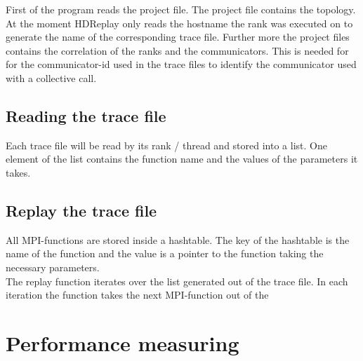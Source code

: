 \documentclass[10pt,a4paper]{scrartcl}
\begin{document}
\begin{small}
First of the program reads the project file. The project file contains the
topology. At the moment HDReplay only reads the hostname the rank was executed
on to generate the name of the corresponding trace file. Further more the
project files contains the correlation of the ranks and the communicators. This
is needed for for the communicator-id used in the trace files to identify the 
communicator used with a collective call. 

\subsection{Reading the trace file}

Each trace file will be read by its rank / thread and stored into a list.
One element of the list contains the function name and the values of the 
parameters it takes. 

\subsection{Replay the trace file}

All MPI-functions are stored inside a hashtable. The key of the hashtable is the
name of the function and the value is a pointer to the function taking the
necessary parameters.\\
The replay function iterates over the list generated out of the trace file. In
each iteration the function takes the next MPI-function out of the

\section{Performance measuring}
  

\end{small}
\end{document}
